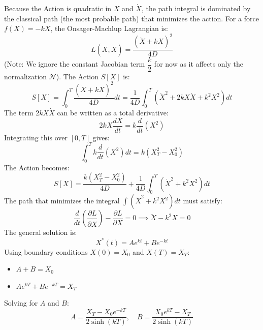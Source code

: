 \documentclass[12pt]{article}
\begin{document}
\begin{singlespace}
Because the Action is quadratic in $X$ and $\dot{X}$, the path integral is dominated by the classical path (the most probable path) that minimizes the action.
For a force $f(X) = -kX$, the Onsager-Machlup Lagrangian is:
\begin{equation}
L(X, \dot{X}) = \frac{(\dot{X} + kX)^2}{4D}
\end{equation}
(Note: We ignore the constant Jacobian term $\dfrac{k}{2}$ for now as it affects only the normalization $\mathcal{N}$). The Action $S[X]$ is:
\begin{equation}
S[X] = \int_0^T \frac{(\dot{X} + kX)^2}{4D} dt = \frac{1}{4D} \int_0^T (\dot{X}^2 + 2kX\dot{X} + k^2 X^2) dt
\end{equation}
The term $2kX\dot{X}$ can be written as a total derivative:
\begin{equation}
2kX\frac{dX}{dt} = k \frac{d}{dt}(X^2)
\end{equation}
Integrating this over $[0, T]$ gives:
\begin{equation}
\int_0^T k \frac{d}{dt}(X^2) dt = k(X_T^2 - X_0^2)
\end{equation}
The Action becomes:
\begin{equation}
S[X] = \frac{k(X_T^2 - X_0^2)}{4D} + \frac{1}{4D} \int_0^T (\dot{X}^2 + k^2 X^2) dt
\end{equation}
The path that minimizes the integral $\int (\dot{X}^2 + k^2 X^2) dt$ must satisfy:
\begin{equation}
\frac{d}{dt}\left(\frac{\partial L}{\partial \dot{X}}\right) - \frac{\partial L}{\partial X} = 0 \implies \ddot{X} - k^2 X = 0
\end{equation}
The general solution is:
\begin{equation}
X^*(t) = A e^{kt} + B e^{-kt}
\end{equation}
Using boundary conditions $X(0) = X_0$ and $X(T) = X_T$:
\begin{itemize}
    \item $A + B = X_0$
    \item $A e^{kT} + B e^{-kT} = X_T$
\end{itemize}
Solving for $A$ and $B$:
\begin{equation}
A = \frac{X_T - X_0 e^{-kT}}{2 \sinh(kT)}, \quad B = \frac{X_0 e^{kT} - X_T}{2 \sinh(kT)}
\end{equation}


\end{singlespace}
\end{document}
